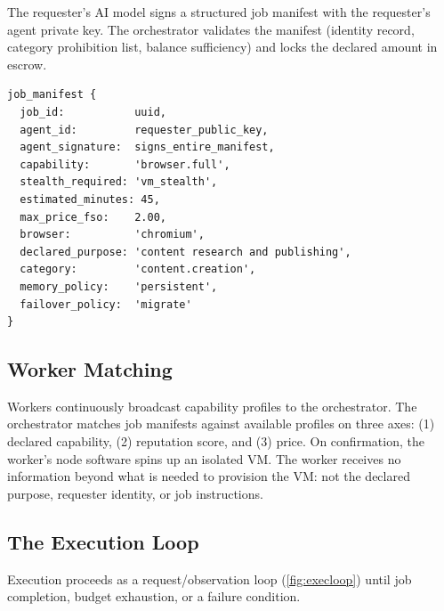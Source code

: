 \documentclass[10pt,twocolumn]{article}
\begin{document}
The requester's AI model signs a structured job manifest with the requester's agent private key. The orchestrator validates the manifest (identity record, category prohibition list, balance sufficiency) and locks the declared amount in escrow.

\begin{lstlisting}[language={},caption={Job Manifest Structure},label={lst:manifest}]
job_manifest {
  job_id:           uuid,
  agent_id:         requester_public_key,
  agent_signature:  signs_entire_manifest,
  capability:       'browser.full',
  stealth_required: 'vm_stealth',
  estimated_minutes: 45,
  max_price_fso:    2.00,
  browser:          'chromium',
  declared_purpose: 'content research and publishing',
  category:         'content.creation',
  memory_policy:    'persistent',
  failover_policy:  'migrate'
}
\end{lstlisting}

\subsection{Worker Matching}

Workers continuously broadcast capability profiles to the orchestrator. The orchestrator matches job manifests against available profiles on three axes: (1) declared capability, (2) reputation score, and (3) price. On confirmation, the worker's node software spins up an isolated VM. The worker receives no information beyond what is needed to provision the VM: not the declared purpose, requester identity, or job instructions.

\subsection{The Execution Loop}

Execution proceeds as a request/observation loop (\cref{fig:execloop}) until job completion, budget exhaustion, or a failure condition.
\end{document}
